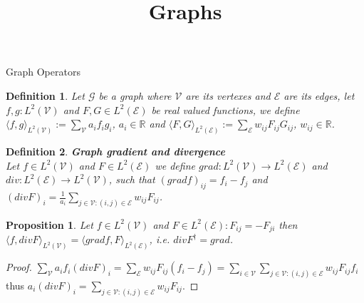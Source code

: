 \documentclass{article}
\title{Graphs}
\author{}
\date{}
\newtheorem{prop}[thm]{Proposition}
\newtheorem{defn}{Definition}[section]
\newcommand{\bb}[1]{\textbf{#1}}
\newcommand{\R}{\mathbb{R}}
\newcommand{\scal}[2]{\langle #1 , #2 \rangle}
\newcommand{\mc}{\mathcal}
\begin{document}
    \maketitle
    \begin{section}{Graph Operators}
        
	\begin{defn}
            Let $\mc{G}$ be a graph where $\mc{V}$ are its vertexes and $\mc{E}$ are its edges, let $f,g : L^2(\mc{V})$ 
	    and $F,G \in L^2(\mc{E})$ be real valued functions, we define
	    $\scal{f}{g}_{L^2(\mc{V})} := \sum_\mc{V} a_i f_i g_i$, $a_i \in \R$ and
	    $\scal{F}{G}_{L^2(\mc{E})} := \sum_\mc{E} w_{ij} F_{ij} G_{ij}$, $w_{ij} \in \R$.
	\end{defn}
        
	\begin{defn}
	    \bb{Graph gradient and divergence}\\ 
	    Let $f \in L^2(\mc{V})$ and $F \in L^2(\mc{E})$ we define $grad : L^2(\mc{V}) \to L^2(\mc{E})$ and $div : L^2(\mc{E}) \to L^2(\mc{V})$,
	    such that $(gradf)_{ij}=f_i-f_j$ and $(divF)_i=\frac{1}{a_i}\sum_{j \in \mc{V} : (i,j) \in \mc{E}} w_{ij} F_{ij}$.
	\end{defn}

	\begin{prop}
	    Let $f \in L^2(\mc{V})$ and $F \in L^2(\mc{E}) : F_{ij}=-F_{ji}$ then $\scal{f}{divF}_{L^2(\mc{V})} = \scal{gradf}{F}_{L^2(\mc{E})}$,
	    i.e. $divF^\dag = grad$.
	\end{prop}
	\begin{proof}
	    $\sum_\mc{V} a_i f_i (divF)_i = \sum_{\mc{E}} w_{ij} F_{ij} (f_i-f_j) = \sum_{i \in \mc{V}}\sum_{j \in \mc{V} : (i,j) \in \mc{E}} w_{ij} F_{ij} f_i$
	    thus $a_i (divF)_i = \sum_{j \in \mc{V} : (i,j) \in \mc{E}} w_{ij} F_{ij}$.
	\end{proof}


\end{section}
\end{document}
